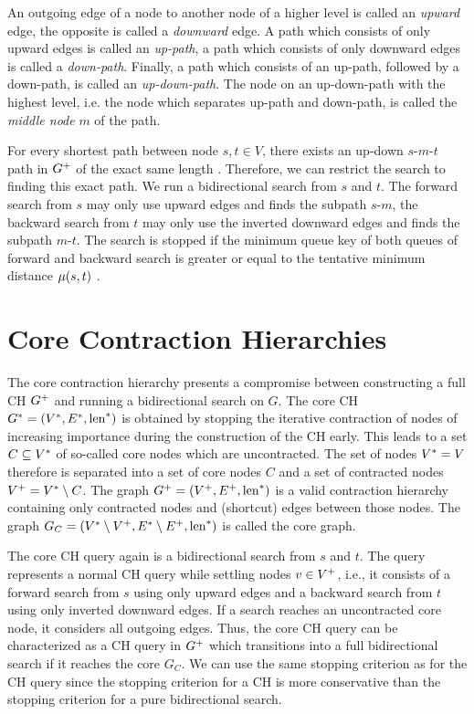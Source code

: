 An outgoing edge of a node to another node of a higher level is called an \emph{upward} edge, the opposite is called a \emph{downward} edge. A path which consists of only upward edges is called an \emph{up-path}, a path which consists of only downward edges is called a \emph{down-path}. Finally, a path which consists of an up-path, followed by a down-path, is called an \emph{up-down-path}. The node on an up-down-path with the highest level, i.e. the node which separates up-path and down-path, is called the \emph{middle node} $m$ of the path.

For every shortest path between node $s,t \in V$, there exists an up-down $s$-$m$-$t$ path in $G^+$ of the exact same length \cite{geisberger:2012}. Therefore, we can restrict the search to finding this exact path. We run a bidirectional search from $s$ and $t$. The forward search from $s$ may only use upward edges and finds the subpath $s$-$m$, the backward search from $t$ may only use the inverted downward edges and finds the subpath $m$-$t$. The search is stopped if the minimum queue key of both queues of forward and backward search is greater or equal to the tentative minimum distance $\mu(s,t)$ \cite{geisberger:2012}.


\section{Core Contraction Hierarchies\label{sec:core_ch}}
The core contraction hierarchy presents a compromise between constructing a full CH $G^+$ and running a bidirectional search on $G$. The core CH $G^* = (V^*,E^*,\operatorname{len}^*)$ is obtained by stopping the iterative contraction of nodes of increasing importance during the construction of the CH early. This leads to a set $C \subseteq V^*$ of so-called core nodes which are uncontracted. The set of nodes $V^* = V$ therefore is separated into a set of core nodes $C$ and a set of contracted nodes $V^+ = V^* \setminus C$. The graph $G^+ = (V^+,E^+,\operatorname{len}^*)$ is a valid contraction hierarchy containing only contracted nodes and (shortcut) edges between those nodes. The graph $G_{C} = (V^* \setminus V^+, E^* \setminus E^+,\operatorname{len}^*)$ is called the core graph.

The core CH query again is a bidirectional search from $s$ and $t$. The query represents a normal CH query while settling nodes $v \in V^+$, i.e., it consists of a forward search from $s$ using only upward edges and a backward search from $t$ using only inverted downward edges. If a search reaches an uncontracted core node, it considers all outgoing edges. Thus, the core CH query can be characterized as a CH query in $G^+$ which transitions into a full bidirectional search if it reaches the core $G_C$. We can use the same stopping criterion as for the CH query since the stopping criterion for a CH is more conservative than the stopping criterion for a pure bidirectional search.


